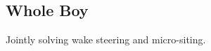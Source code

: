 \documentclass[12pt]{article}
\begin{document}
\subsection{Whole Boy}

Jointly solving wake steering and micro-siting.

%
%
%
%
\end{document}
